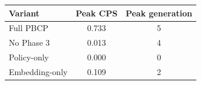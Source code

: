 \begin{tabular}{lcc}
\toprule
Variant & Peak CPS & Peak generation \\
\midrule
Full PBCP & 0.733 & 5 \\
No Phase 3 & 0.013 & 4 \\
Policy-only & 0.000 & 0 \\
Embedding-only & 0.109 & 2 \\
\bottomrule
\end{tabular}
